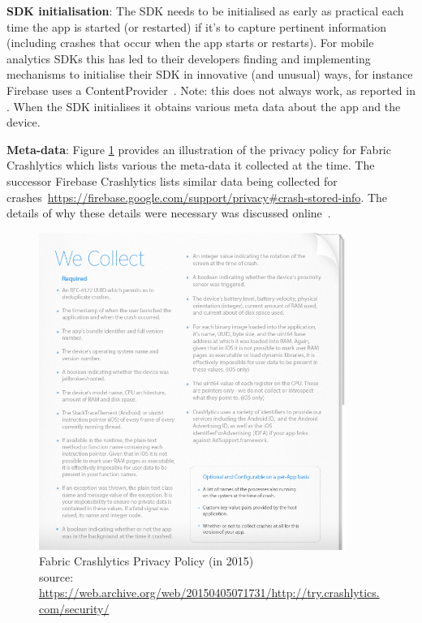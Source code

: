 \textbf{SDK initialisation}: 
The SDK needs to be initialised as early as practical each time the app is started (or restarted) if it's to capture pertinent information (including crashes that occur when the app starts or restarts). For mobile analytics SDKs this has led to their developers finding and implementing mechanisms to initialise their SDK in innovative (and unusual) ways, for instance Firebase uses a ContentProvider~\citep{stevenson2016_how_does_firebase_initialize_on_android}. Note: this does not always work, as reported in \citep{reddy2022_crashlytics_fails_to_track_app_startup_crashes}. When the SDK initialises it obtains various meta data about the app and the device. 

\textbf{Meta-data}: 
Figure \ref{fig:fabric-crashlytics-privacy-policy} provides an illustration of the privacy policy for Fabric Crashlytics which lists various the meta-data it collected at the time. The successor Firebase Crashlytics lists similar data being collected for crashes~\url{https://firebase.google.com/support/privacy#crash-stored-info}. The details of why these details were necessary was discussed online~\citep{kim2017_what_information_does_crashlytics_collect_from_end_users}.

\begin{figure}
    \centering
    \includegraphics[width=10cm]{images/fabric-crashlytics/crashlytics-privacy-policy-38154ffbd69ef44a478b54365dc9b3ad.png}
    \caption{Fabric Crashlytics Privacy Policy (in 2015)\\{source: \tiny \url{https://web.archive.org/web/20150405071731/http://try.crashlytics.com/security/}}}
    \label{fig:fabric-crashlytics-privacy-policy}
\end{figure}

